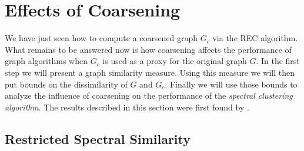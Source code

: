 \section{Effects of Coarsening}%
\label{sec:cons}

We have just seen how to compute a coarsened graph $G_c$ via the REC algorithm.
What remains to be answered now is how coarsening affects the performance of graph algorithms when $G_c$ is used as a proxy for the original graph $G$.
In the first step we will present a graph similarity measure.
Using this measure we will then put bounds on the dissimilarity of $G$ and $G_c$.
Finally we will use those bounds to analyze the influence of coarsening on the performance of the \textit{spectral clustering algorithm}.
The results described in this section were first found by \citet{Loukas2018}.

\subsection{Restricted Spectral Similarity}%
\label{sec:cons:rss}

